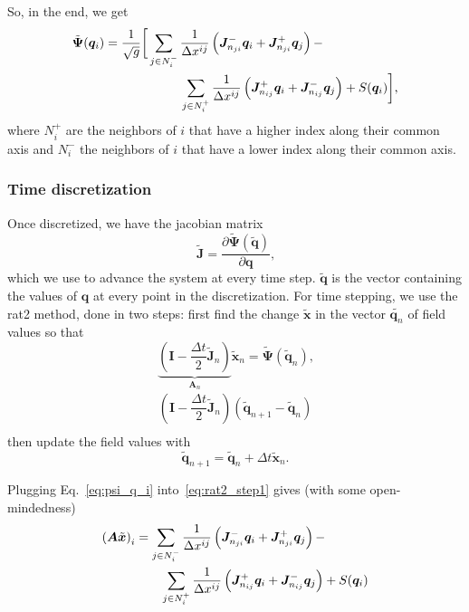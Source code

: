 \documentclass[12pt]{article}
\begin{document}
So, in the end, we get
\begin{align}
    \tilde{\bm{\Psi}}(\bm{q}_i) &=
        \dfrac{1}{\sqrt{g}} \bigg[
           \sum_{j \in N_i^-} \dfrac{1}{\Delta x^{ij}}\left( \bm{J}^-_{n_{ji}} \bm{q}_i + \bm{J}^+_{n_{ji}} \bm{q}_j \right) -
           \notag \\ & \qquad\qquad\qquad \label{eq:psi_q_i}
           \sum_{j \in N_i^+} \dfrac{1}{\Delta x^{ij}}\left( \bm{J}^+_{n_{ij}} \bm{q}_i + \bm{J}^-_{n_{ij}} \bm{q}_j \right)
           + S(\bm{q}_i)
        \bigg]
    \text{,}
\end{align}
where $N_i^+$ are the neighbors of $i$ that have a higher index along their common axis and
$N_i^-$ the neighbors of $i$ that have a lower index along their common axis.


\subsubsection{Time discretization}

Once discretized, we have the jacobian matrix
\begin{equation}
    \tilde{\bm{J}} = \dfrac{\partial\tilde{\bm{\Psi}}(\tilde{\bm{q}})}{\partial\bm{q}}
    \text{,}
\end{equation}
which we use to advance the system at every time step. $\tilde{\bm{q}}$ is the vector containing the values of $\bm{q}$ at every point in the discretization. For time stepping, we use the rat2 method, done in two steps:
first find the change $\tilde{\bm{x}}$ in the vector $\tilde{\bm{q}_n}$ of field values so that
\begin{equation}
    \underbrace{\left( \bm{I} - \dfrac{\Delta t}{2} \tilde{\bm{J}}_n \right)}_{\bm{A}_n}{}
        \tilde{\bm{x}}_n
    = \tilde{\bm{\Psi}}(\tilde{\bm{q}}_n) \label{eq:rat2_step1}
    \text{,}
\end{equation}
\begin{align}
    \left( \bm{I} - \dfrac{\Delta t}{2} \tilde{\bm{J}}_n \right)
        (\tilde{\bm{q}}_{n+1} - \tilde{\bm{q}}_n)
    \\
\end{align}
then update the field values with
\begin{equation}
    \tilde{\bm{q}}_{n+1} = \tilde{\bm{q}}_n + \Delta t \tilde{\bm{x}}_n 
    \text{.}
\end{equation}

Plugging Eq.~\ref{eq:psi_q_i} into~\ref{eq:rat2_step1} gives (with some open-mindedness)
\begin{align}
    \left( \bm{A} \tilde{\bm{x}} \right)_i &=
    \sum_{j \in N_i^-} \dfrac{1}{\Delta x^{ij}}\left( \bm{J}^-_{n_{ji}} \bm{q}_i + \bm{J}^+_{n_{ji}} \bm{q}_j \right) -
    \notag\\ & \qquad
    \sum_{j \in N_i^+} \dfrac{1}{\Delta x^{ij}}\left( \bm{J}^+_{n_{ij}} \bm{q}_i + \bm{J}^-_{n_{ij}} \bm{q}_j \right) + S(\bm{q}_i)
\end{align}
\end{document}
